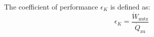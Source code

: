 The coefficient of performance \( \epsilon_K \) is defined as:  
\[
\epsilon_K = \frac{\dot{W}_{\text{nutz}}}{\dot{Q}_{\text{zu}}}
\]